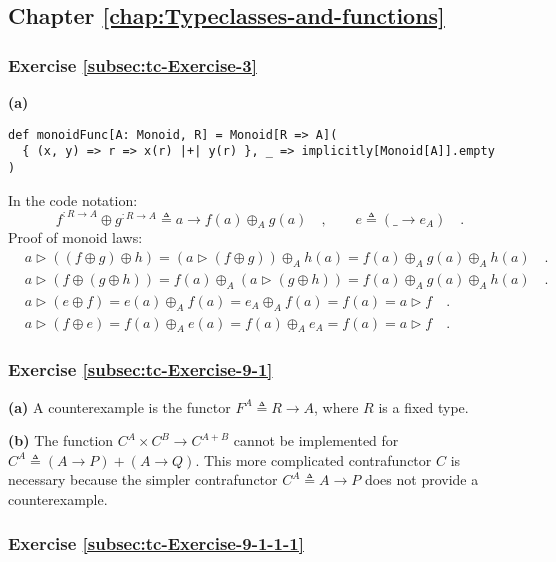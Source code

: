 \subsection*{Chapter \ref{chap:Typeclasses-and-functions}}

\subsubsection*{Exercise \ref{subsec:tc-Exercise-3}}

\textbf{(a)}
\begin{lstlisting}
def monoidFunc[A: Monoid, R] = Monoid[R => A](
  { (x, y) => r => x(r) |+| y(r) }, _ => implicitly[Monoid[A]].empty
)
\end{lstlisting}

In the code notation:
\[
f^{:R\rightarrow A}\oplus g^{:R\rightarrow A}\triangleq a\rightarrow f(a)\oplus_{A}g(a)\quad,\quad\quad e\triangleq(\_\rightarrow e_{A})\quad.
\]
Proof of monoid laws:
\begin{align*}
 & a\triangleright\left(\left(f\oplus g\right)\oplus h\right)=\left(a\triangleright(f\oplus g)\right)\oplus_{A}h(a)=f(a)\oplus_{A}g(a)\oplus_{A}h(a)\quad.\\
 & a\triangleright\left(f\oplus\left(g\oplus h\right)\right)=f(a)\oplus_{A}\left(a\triangleright(g\oplus h)\right)=f(a)\oplus_{A}g(a)\oplus_{A}h(a)\quad.\\
 & a\triangleright\left(e\oplus f\right)=e(a)\oplus_{A}f(a)=e_{A}\oplus_{A}f(a)=f(a)=a\triangleright f\quad.\\
 & a\triangleright(f\oplus e)=f(a)\oplus_{A}e(a)=f(a)\oplus_{A}e_{A}=f(a)=a\triangleright f\quad.
\end{align*}


\subsubsection*{Exercise \ref{subsec:tc-Exercise-9-1} }

\textbf{(a)} A counterexample is the functor $F^{A}\triangleq R\rightarrow A$,
where $R$ is a fixed type.

\textbf{(b)} The function $C^{A}\times C^{B}\rightarrow C^{A+B}$
cannot be implemented for $C^{A}\triangleq\left(A\rightarrow P\right)+\left(A\rightarrow Q\right)$.
This more complicated contrafunctor $C$ is necessary because the
simpler contrafunctor $C^{A}\triangleq A\rightarrow P$ does not provide
a counterexample.

\subsubsection*{Exercise \ref{subsec:tc-Exercise-9-1-1-1}}

